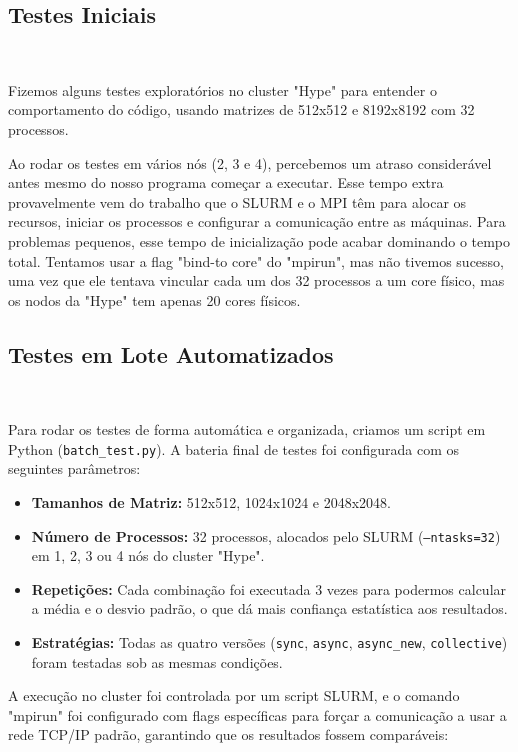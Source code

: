 \documentclass{article}
\begin{document}
\subsection{Testes Iniciais}
\

Fizemos alguns testes exploratórios no cluster "Hype" para entender o comportamento do código, usando matrizes de 512x512 e 8192x8192 com 32 processos.

Ao rodar os testes em vários nós (2, 3 e 4), percebemos um atraso considerável antes mesmo do nosso programa começar a executar. Esse tempo extra provavelmente vem do trabalho que o SLURM e o MPI têm para alocar os recursos, iniciar os processos e configurar a comunicação entre as máquinas. Para problemas pequenos, esse tempo de inicialização pode acabar dominando o tempo total. Tentamos usar a flag "bind-to core" do "mpirun", mas não tivemos sucesso, uma vez que ele tentava vincular cada um dos 32 processos a um core físico, mas os nodos da "Hype" tem apenas 20 cores físicos.

\subsection{Testes em Lote Automatizados}
\

Para rodar os testes de forma automática e organizada, criamos um script em Python (\texttt{batch\_test.py}). A bateria final de testes foi configurada com os seguintes parâmetros:
\begin{itemize}
    \item \textbf{Tamanhos de Matriz:} 512x512, 1024x1024 e 2048x2048.
    
    \item \textbf{Número de Processos:} 32 processos, alocados pelo SLURM (\texttt{--ntasks=32}) em 1, 2, 3 ou 4 nós do cluster "Hype".
    
    \item \textbf{Repetições:} Cada combinação foi executada 3 vezes para podermos calcular a média e o desvio padrão, o que dá mais confiança estatística aos resultados.
    
    \item \textbf{Estratégias:} Todas as quatro versões (\texttt{sync}, \texttt{async}, \texttt{async\_new}, \texttt{collective}) foram testadas sob as mesmas condições.
\end{itemize}

A execução no cluster foi controlada por um script SLURM, e o comando "mpirun" foi configurado com flags específicas para forçar a comunicação a usar a rede TCP/IP padrão, garantindo que os resultados fossem comparáveis:
\end{document}
